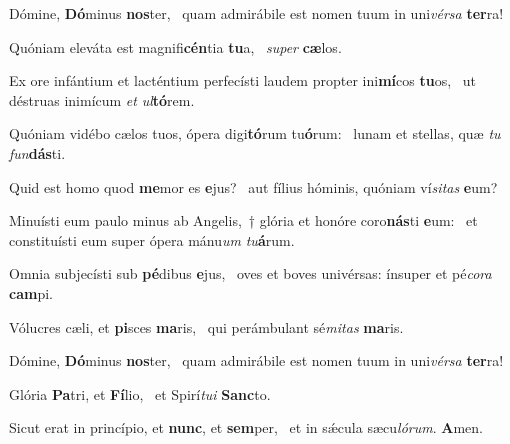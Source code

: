 \item Dómine, \textbf{Dó}minus \textbf{nos}ter,~\psstar{} quam admirábile est nomen tuum in uni\textit{vérsa} \textbf{ter}ra!
\item Quóniam eleváta est magnifi\textbf{cén}tia \textbf{tu}a,~\psstar{} \textit{super} \textbf{cæ}los.
\item Ex ore infántium et lacténtium perfecísti laudem propter ini\textbf{mí}cos \textbf{tu}os,~\psstar{} ut déstruas inimícum \textit{et} \textit{ul}\textbf{tó}rem.
\item Quóniam vidébo cælos tuos, ópera digi\textbf{tó}rum tu\textbf{ó}rum:~\psstar{} lunam et stellas, quæ \textit{tu} \textit{fun}\textbf{dás}ti.
\item Quid est homo quod \textbf{me}mor es \textbf{e}jus?~\psstar{} aut fílius hóminis, quóniam ví\textit{sitas} \textbf{e}um?
\item Minuísti eum paulo minus ab Angelis,~† glória et honóre coro\textbf{nás}ti \textbf{e}um:~\psstar{} et constituísti eum super ópera mánu\textit{um} \textit{tu}\textbf{á}rum.
\item Omnia subjecísti sub \textbf{pé}dibus \textbf{e}jus,~\psstar{} oves et boves univérsas: ínsuper et pé\textit{cora} \textbf{cam}pi.
\item Vólucres cæli, et \textbf{pi}sces \textbf{ma}ris,~\psstar{} qui perámbulant sé\textit{mitas} \textbf{ma}ris.
\item Dómine, \textbf{Dó}minus \textbf{nos}ter,~\psstar{} quam admirábile est nomen tuum in uni\textit{vérsa} \textbf{ter}ra!
\item Glória \textbf{Pa}tri, et \textbf{Fí}lio,~\psstar{} et Spirí\textit{tui} \textbf{Sanc}to.
\item Sicut erat in princípio, et \textbf{nunc}, et \textbf{sem}per,~\psstar{} et in sǽcula sæcu\textit{lórum}. \textbf{A}men.